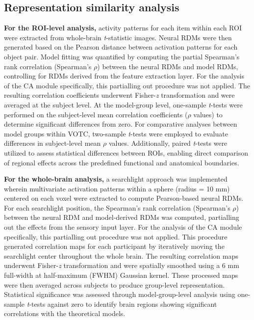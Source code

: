 \documentclass[pdflatex,sn-mathphys-num,lineno]{sn-jnl}%
\begin{document}
\begin{CJK}{UTF8}{gbsn}
\subsection{Representation similarity analysis}
\textbf{For the ROI-level analysis,} activity patterns for each item within each ROI were extracted from whole-brain \textit{t}-statistic images. Neural RDMs were then generated based on the Pearson distance between activation patterns for each object pair. Model fitting was quantified by computing the partial Spearman’s rank correlation (Spearman’s $\rho$) between the neural RDMs and model RDMs, controlling for RDMs derived from the feature extraction layer. For the analysis of the CA module specifically, this partialling out procedure was not applied. The resulting correlation coefficients underwent Fisher-\textit{z} transformation and were averaged at the subject level. At the model-group level, one-sample \textit{t}-tests were performed on the subject-level mean correlation coefficients ($\rho$ values) to determine significant differences from zero. For comparative analyses between model groups within VOTC, two-sample \textit{t}-tests were employed to evaluate differences in subject-level mean $\rho$ values. Additionally, paired \textit{t}-tests were utilized to assess statistical differences between ROIs, enabling direct comparison of regional effects across the predefined functional and anatomical boundaries.

\textbf{For the whole-brain analysis,} a searchlight approach was implemented wherein multivariate activation patterns within a sphere (radius = 10 mm) centered on each voxel were extracted to compute Pearson-based neural RDMs. For each searchlight position, the Spearman’s rank correlation (Spearman’s $\rho$) between the neural RDM and model-derived RDMs was computed, partialling out the effects from the sensory input layer. For the analysis of the CA module specifically, this partialling out procedure was not applied. This procedure generated correlation maps for each participant by iteratively moving the searchlight center throughout the whole brain. The resulting correlation maps underwent Fisher-\textit{z} transformation and were spatially smoothed using a 6 mm full-width at half-maximum (FWHM) Gaussian kernel. These processed maps were then averaged across subjects to produce group-level representation. Statistical significance was assessed through model-group-level analysis using one-sample \textit{t}-tests against zero to identify brain regions showing significant correlations with the theoretical models.


\end{CJK}
\end{document}
